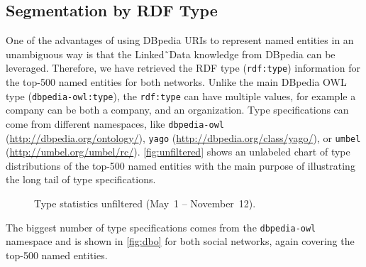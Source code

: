 \documentclass{iosart2c}
\begin{document}
\subsection{Segmentation by RDF Type}
One of the advantages of using DBpedia URIs to represent named entities in an unambiguous way is that the Linked˜Data knowledge from DBpedia can be leveraged.
Therefore, we have retrieved the RDF type (\texttt{rdf:type}) information for the top-500 named entities for both networks.
Unlike the main DBpedia OWL type (\texttt{dbpedia-owl:type}), the \texttt{rdf:type} can have multiple values, for example a company can be both a company, and an organization.
Type specifications can come from different namespaces, like \texttt{dbpedia-owl} (\url{http://dbpedia.org/ontology/}), \texttt{yago} (\url{http://dbpedia.org/class/yago/}), or \texttt{umbel} (\url{http://umbel.org/umbel/rc/}).
\autoref{fig:unfiltered} shows an unlabeled chart of type distributions of the top-500 named entities with the main purpose of illustrating the long tail of type specifications. 

\begin{figure}
  \centering
    \qquad
\caption{Type statistics unfiltered (May~1 -- November~12).}
\label{fig:unfiltered}
\end{figure}

The biggest number of type specifications comes from the \texttt{dbpedia-owl} namespace and is shown in \autoref{fig:dbo} for both social networks, again covering the top-500 named entities.
\end{document}
